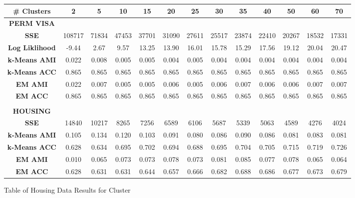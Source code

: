 \documentclass[h]{article}
\begin{document}
\begin{figure}[H] 
\begin{tabular}{ | c | c  | c | c | c | c | c | c| c| c| c| c| c | } 
\hline
\textbf{ # Clusters } & \textbf{2} & \textbf{5} & \textbf{10} & \textbf{15} & \textbf{20} & \textbf{25} & \textbf{30} & \textbf{35} & \textbf{40} & \textbf{50} & \textbf{60} & \textbf{70}   \\
\hline

\textbf{PERM VISA} \\ \hline
\textbf{SSE} &  108717 & 71834 & 47453 & 37701 & 31090 & 27611 & 25517 & 23874 & 22410 & 20267 & 18532 & 17331 \\ \hline
\textbf{Log Liklihood} & -9.44 & 2.67 & 9.57 & 13.25 & 13.90 & 16.01 & 15.78 & 15.29 & 17.56 & 19.12 & 20.04 & 20.47 \\ \hline
\textbf{k-Means AMI} & 0.022 & 0.008 & 0.005 & 0.005 & 0.004 & 0.005 & 0.004 & 0.004 & 0.004 & 0.004 & 0.004 & 0.004 \\ \hline
\textbf{k-Means ACC} & 0.865 & 0.865 & 0.865 & 0.865 & 0.865 & 0.865 & 0.865 & 0.865 & 0.865 & 0.865 & 0.865 & 0.865 \\ \hline
\textbf{EM AMI} & 0.022 & 0.007 & 0.005 & 0.005 & 0.006 & 0.005 & 0.006 & 0.007 & 0.006 & 0.006 & 0.007 & 0.007 \\ \hline
\textbf{EM ACC} & 0.865 & 0.865 & 0.865 & 0.865 & 0.865 & 0.865 & 0.865 & 0.865 & 0.865 & 0.865 & 0.865 & 0.865 \\ \hline
\\
\textbf{HOUSING} \\ \hline
\textbf{SSE} & 14840 & 10217 & 8265 & 7256 & 6589 & 6106 & 5687 & 5339 & 5063 & 4589 & 4276 & 4024 \\ \hline
\textbf{k-Means AMI} & 0.105 & 0.134 & 0.120 & 0.103 & 0.091 & 0.080 & 0.086 & 0.090 & 0.086 & 0.081 & 0.083 & 0.081 \\ \hline
\textbf{k-Means ACC} & 0.628 & 0.634 & 0.695 & 0.702 & 0.694 & 0.688 & 0.695 & 0.704 & 0.705 & 0.715 & 0.719 & 0.726 \\ \hline
\textbf{EM AMI} & 0.010 & 0.065 & 0.073 & 0.073 & 0.078 & 0.073 & 0.081 & 0.085 & 0.077 & 0.078 & 0.065 & 0.064 \\ \hline
\textbf{EM ACC} & 0.628 & 0.631 & 0.631 & 0.644 & 0.657 & 0.666 & 0.682 & 0.688 & 0.686 & 0.677 & 0.673 & 0.679 \\ \hline
\end{tabular}
\caption*{Table of Housing Data Results for Cluster } 
\end{figure}
\end{document}
